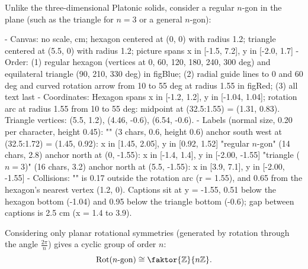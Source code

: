 \begin{content}
Unlike the three-dimensional Platonic solids, consider a regular $n$-gon in the plane (such as the triangle for $n = 3$ or a general $n$-gon):

\begin{hidden}
- Canvas: no scale, cm; hexagon centered at (0, 0) with radius 1.2; triangle centered at (5.5, 0) with radius 1.2;
  picture spans x in [-1.5, 7.2], y in [-2.0, 1.7]
- Order: (1) regular hexagon (vertices at 0, 60, 120, 180, 240, 300 deg) and equilateral triangle (90, 210, 330 deg)
  in figBlue; (2) radial guide lines to 0 and 60 deg and curved rotation arrow from 10 to 55 deg at radius 1.55 in figRed;
  (3) all text last
- Coordinates:
  Hexagon spans x in [-1.2, 1.2], y in [-1.04, 1.04]; rotation arc at radius 1.55 from 10 to 55 deg: midpoint at
  (32.5:1.55) = (1.31, 0.83).
  Triangle vertices: (5.5, 1.2), (4.46, -0.6), (6.54, -0.6).
- Labels (normal size, 0.20 per character, height 0.45):
  "" (3 chars, 0.6, height 0.6) anchor south west at (32.5:1.72) = (1.45, 0.92): x in [1.45, 2.05], y in [0.92, 1.52]
  "regular $n$-gon" (14 chars, 2.8) anchor north at (0, -1.55): x in [-1.4, 1.4], y in [-2.00, -1.55]
  "triangle ($n = 3$)" (16 chars, 3.2) anchor north at (5.5, -1.55): x in [3.9, 7.1], y in [-2.00, -1.55]
- Collisions: "" is 0.17 outside the rotation arc (r = 1.55), and 0.65 from the hexagon's nearest vertex (1.2, 0).
  Captions sit at y = -1.55, 0.51 below the hexagon bottom (-1.04) and 0.95 below the triangle bottom (-0.6); gap between
  captions is 2.5 cm (x = 1.4 to 3.9).
\end{hidden}
\begin{center}
\end{center}

Considering only planar rotational symmetries (generated by rotation through the angle $\frac{2\pi}{n}$) gives a cyclic group of order $n$:
\[
\operatorname{Rot}(n\text{-gon}) \cong \faktor{\mathbb{Z}}{n\mathbb{Z}}.
\]
\end{content}

